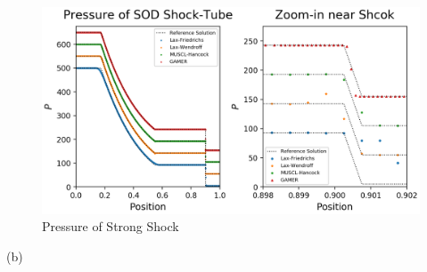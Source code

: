 \documentclass[a4paper,10pt]{article}
\begin{document}
\begin{figure}[htbp] %
\centering %
\includegraphics[width=15cm]{pressure_1-1.png} %
\caption{Pressure of Strong Shock}
\end{figure}
\newpage
\setlength{\parindent}{0em}(b)
\end{document}
